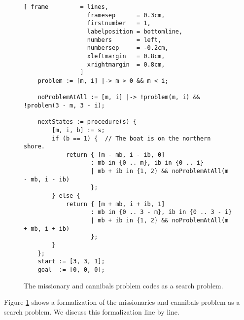 \begin{figure}[!ht]
\centering
\begin{Verbatim}[ frame         = lines,
                  framesep      = 0.3cm,
                  firstnumber   = 1,
                  labelposition = bottomline,
                  numbers       = left,
                  numbersep     = -0.2cm,
                  xleftmargin   = 0.8cm,
                  xrightmargin  = 0.8cm,
                ]
    problem := [m, i] |-> m > 0 && m < i;

    noProblemAtAll := [m, i] |-> !problem(m, i) && !problem(3 - m, 3 - i);

    nextStates := procedure(s) {
        [m, i, b] := s;
        if (b == 1) {  // The boat is on the northern shore.
            return { [m - mb, i - ib, 0]
                   : mb in {0 .. m}, ib in {0 .. i}
                   | mb + ib in {1, 2} && noProblemAtAll(m - mb, i - ib)
                   };
        } else {
            return { [m + mb, i + ib, 1]
                   : mb in {0 .. 3 - m}, ib in {0 .. 3 - i}
                   | mb + ib in {1, 2} && noProblemAtAll(m + mb, i + ib)
                   };
        }
    };
    start := [3, 3, 1];
    goal  := [0, 0, 0];
\end{Verbatim}
\vspace*{-0.3cm}
\caption{The missionary and cannibals problem codes as a search problem.}
\label{fig:missionaries.stlx}
\end{figure}
\noindent
Figure \ref{fig:missionaries.stlx} shows a formalization of the missionaries and cannibals problem
as a search problem.  We discuss this formalization line by line.
